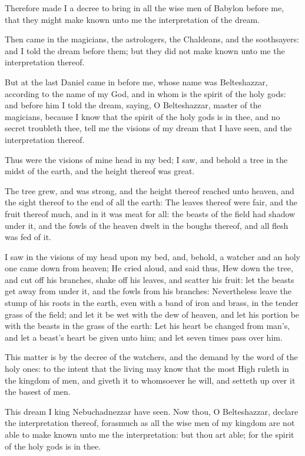 \Verse Therefore made I a decree to bring in all the wise men of Babylon before me, that they might make known unto me the interpretation of the dream.

\Verse Then came in the magicians, the astrologers, the Chaldeans, and the soothsayers: and I told the dream before them; but they did not make known unto me the interpretation thereof.

\Verse But at the last Daniel came in before me, whose name was Belteshazzar, according to the name of my God, and in whom is the spirit of the holy gods: and before him I told the dream, saying, \Verse O Belteshazzar, master of the magicians, because I know that the spirit of the holy gods is in thee, and no secret troubleth thee, tell me the visions of my dream that I have seen, and the interpretation thereof.

\Verse Thus were the visions of mine head in my bed; I saw, and behold a tree in the midst of the earth, and the height thereof was great.

\Verse The tree grew, and was strong, and the height thereof reached unto heaven, and the sight thereof to the end of all the earth: \Verse The leaves thereof were fair, and the fruit thereof much, and in it was meat for all: the beasts of the field had shadow under it, and the fowls of the heaven dwelt in the boughs thereof, and all flesh was fed of it.

\Verse I saw in the visions of my head upon my bed, and, behold, a watcher and an holy one came down from heaven; \Verse He cried aloud, and said thus, Hew down the tree, and cut off his branches, shake off his leaves, and scatter his fruit: let the beasts get away from under it, and the fowls from his branches: \Verse Nevertheless leave the stump of his roots in the earth, even with a band of iron and brass, in the tender grass of the field; and let it be wet with the dew of heaven, and let his portion be with the beasts in the grass of the earth: \Verse Let his heart be changed from man's, and let a beast's heart be given unto him; and let seven times pass over him.

\Verse This matter is by the decree of the watchers, and the demand by the word of the holy ones: to the intent that the living may know that the most High ruleth in the kingdom of men, and giveth it to whomsoever he will, and setteth up over it the basest of men.

\Verse This dream I king Nebuchadnezzar have seen. Now thou, O Belteshazzar, declare the interpretation thereof, forasmuch as all the wise men of my kingdom are not able to make known unto me the interpretation: but thou art able; for the spirit of the holy gods is in thee.

